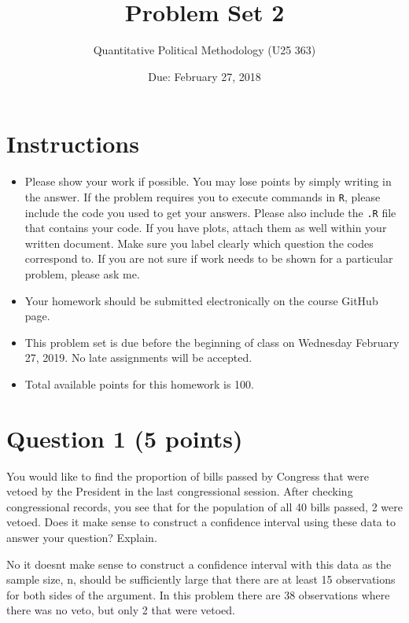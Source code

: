 \documentclass[12pt,letterpaper]{article}
\title{Problem Set 2}
\date{Due: February 27, 2018}
\author{Quantitative Political Methodology (U25 363)}
\begin{document}
	\maketitle

	
	\section*{Instructions}
	\begin{itemize}
		\item Please show your work if possible. You may lose points by simply writing in the answer. If the problem requires you to execute commands in \texttt{R}, please include the code you used to get your answers. Please also include the \texttt{.R} file that contains your code. If you have plots, attach them as well within your written document. Make sure you label clearly which question the codes correspond to. If you are not sure if work needs to be shown for a particular problem, please ask me.
		\item Your homework should be submitted electronically on the course GitHub page.
		\item This problem set is due before the beginning of class on Wednesday February 27, 2019. No late assignments will be accepted.
		\item Total available points for this homework is 100.
	\end{itemize}

\section*{Question 1 (5 points)}
You would like to find the proportion of bills passed by Congress that were vetoed by the
President in the last congressional session. After checking congressional records, you see that
for the population of all 40 bills passed, 2 were vetoed. Does it make sense to construct a
confidence interval using these data to answer your question? Explain.

No it doesnt make sense to construct a confidence interval with this data as the sample size, n, should be sufficiently large that there are at least 15 observations for both sides of the argument. In this problem there are 38 observations where there was no veto, but only 2 that were vetoed.
\end{document}
